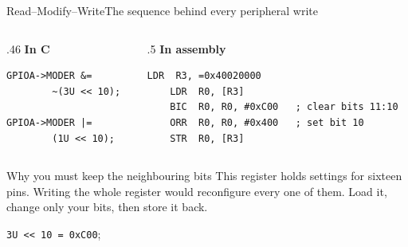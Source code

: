 \documentclass[9pt,aspectratio=169,xcolor=table]{beamer}
\begin{document}
\begin{frame}[fragile]{Read--Modify--Write}{The sequence behind every peripheral write}
    \begin{columns}[T]
    \begin{column}{.46\textwidth}
        \textbf{In C}

        \vspace{1mm}
        \begin{lstlisting}[style=myc]
GPIOA->MODER &=
        ~(3U << 10);

GPIOA->MODER |=
        (1U << 10);
        \end{lstlisting}
    \end{column}
    \begin{column}{.5\textwidth}
        \textbf{In assembly}

        \vspace{1mm}
        \begin{lstlisting}[style=armasm, language=ARM]
	LDR  R3, =0x40020000
	LDR  R0, [R3]
	BIC  R0, R0, #0xC00   ; clear bits 11:10
	ORR  R0, R0, #0x400   ; set bit 10
	STR  R0, [R3]
        \end{lstlisting}
    \end{column}
    \end{columns}

    \vspace{3mm}
    \begin{block}{Why you must keep the neighbouring bits}
        This register holds settings for \alert{sixteen pins}. Writing
        the whole register would reconfigure every one of them.
        \alert{Load it, change only your bits, then store it back.}
    \end{block}

    \vspace{1mm}
    \texttt{3U \texttt{<}< 10 = 0xC00}; 
\end{frame}
\end{document}
